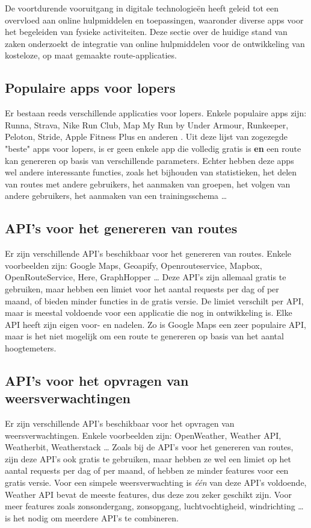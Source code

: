 De voortdurende vooruitgang in digitale technologieën heeft geleid tot een overvloed aan online hulpmiddelen en toepassingen,
waaronder diverse apps voor het begeleiden van fysieke activiteiten.
Deze sectie over de huidige stand van zaken onderzoekt de integratie van online hulpmiddelen voor de ontwikkeling van kosteloze,
op maat gemaakte route-applicaties.

\subsection{Populaire apps voor lopers}
Er bestaan reeds verschillende applicaties voor lopers. Enkele populaire apps zijn:
Runna, Strava, Nike Run Club, Map My Run by Under Armour, Runkeeper, Peloton, Stride, Apple Fitness Plus en anderen \autocite{Downey2023}.
Uit deze lijst van zogezegde "beste" apps voor lopers,
is er geen enkele app die volledig gratis is \textbf{en} een route kan genereren op basis van verschillende parameters.
Echter hebben deze apps wel andere interessante functies, zoals het bijhouden van statistieken, het delen van routes met andere gebruikers,
het aanmaken van groepen, het volgen van andere gebruikers, het aanmaken van een trainingsschema \ldots


\subsection{API's voor het genereren van routes}
Er zijn verschillende API's beschikbaar voor het genereren van routes.
Enkele voorbeelden zijn: Google Maps, Geoapify, Openrouteservice, Mapbox, OpenRouteService, Here, GraphHopper \ldots
Deze API's zijn allemaal gratis te gebruiken, maar hebben een limiet voor het aantal requests per dag of per maand,
of bieden minder functies in de gratis versie. De limiet verschilt per API, maar is meestal voldoende voor een applicatie die nog in ontwikkeling is.
Elke API heeft zijn eigen voor- en nadelen. Zo is Google Maps een zeer populaire API,
maar is het niet mogelijk om een route te genereren op basis van het aantal hoogtemeters.

\subsection{API's voor het opvragen van weersverwachtingen}
Er zijn verschillende API's beschikbaar voor het opvragen van weersverwachtingen.
Enkele voorbeelden zijn: OpenWeather, Weather API, Weatherbit, Weatherstack \ldots
Zoals bij de API's voor het genereren van routes, zijn deze API's ook gratis te gebruiken,
maar hebben ze wel een limiet op het aantal requests per dag of per maand, of hebben ze minder features voor een gratis versie.
Voor een simpele weersverwachting is \emph{één} van deze API's voldoende, Weather API bevat de meeste features,
dus deze zou zeker geschikt zijn. Voor meer features zoals zonsondergang, zonsopgang, luchtvochtigheid, windrichting \ldots
is het nodig om meerdere API's te combineren.

